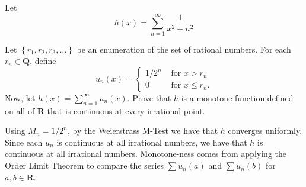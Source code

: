 \begin{exercise}
  Let
  $$
  h(x)=\sum_{n=1}^{\infty} \frac{1}{x^{2}+n^{2}}
  $$
\end{exercise}
\begin{solution}
\end{solution}
\begin{exercise}
  Let $\left\{r_{1}, r_{2}, r_{3}, \ldots\right\}$ be an enumeration of the set of rational numbers. For each $r_{n} \in \mathbf{Q}$, define
  $$
  u_{n}(x)= \begin{cases}1 / 2^{n} & \text { for } x>r_{n} \\ 0 & \text { for } x \leq r_{n} .\end{cases}
  $$
  Now, let $h(x)=\sum_{n=1}^{\infty} u_{n}(x)$. Prove that $h$ is a monotone function defined on all of $\mathbf{R}$ that is continuous at every irrational point.
\end{exercise}

\begin{solution}
    Using \(M_n = 1/2^n\), by the Weierstrass M-Test we have that \(h\) converges uniformly. Since each \(u_n\) is continuous at all irrational numbers, we have that \(h\) is continuous at all irrational numbers. Monotone-ness comes from applying the Order Limit Theorem to compare the series \(\sum u_n(a)\) and \(\sum u_n(b)\) for \(a,b\in \mathbf{R}\).

\end{solution}
